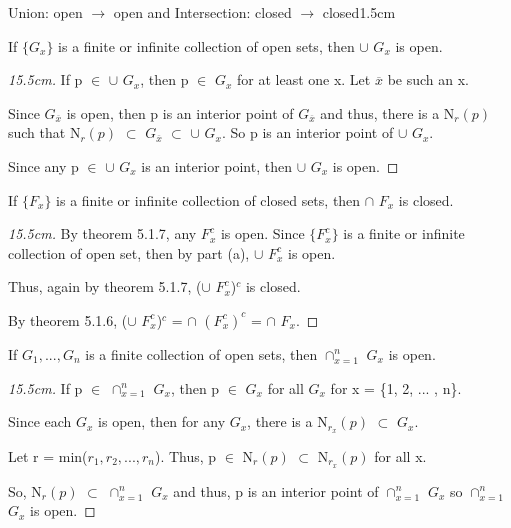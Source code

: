	\begin{ltheorem}{Union: open $\rightarrow$ open and
	Intersection: closed $\rightarrow$ closed}{1.5cm}
		\item If $\{G_x\}$ is a finite or infinite collection of open sets,
		then $\cup$ $G_x$ is open.

			\begin{proof}[15.5cm]
				If p $\in$ $\cup$ $G_x$, then p $\in$ $G_x$ for at least one x.
				Let $\overline{x}$ be such an x.

				Since $G_{\overline{x}}$ is open, then p is an interior point of
				$G_{\overline{x}}$ and thus, there is a N$_r(p)$ such that
				N$_r(p)$ $\subset$ $G_{\overline{x}}$ $\subset$ $\cup$ $G_x$.
				So p is an interior point of $\cup$ $G_x$.

				Since any p $\in$ $\cup$ $G_x$ is an interior point, then
				$\cup$ $G_x$ is open.
			\end{proof}

		\item If $\{F_x\}$ is a finite or infinite collection of closed sets,
		then $\cap$ $F_x$ is closed.

			\begin{proof}[15.5cm]
				By {\color{red} theorem 5.1.7}, any $F_x^c$ is open.
				Since $\{F_x^c\}$ is a finite or infinite collection of
				open set, then by part (a), $\cup$ $F_x^c$ is open.

				Thus, again by {\color{red} theorem 5.1.7},
				($\cup$ $F_x^c$)$^c$ is closed.

				By {\color{red} theorem 5.1.6},
				($\cup$ $F_x^c$)$^c$ = $\cap$ $(F_x^c)^c$
				= $\cap$ $F_x$.
			\end{proof}

		\item If $G_1, ... , G_n$ is a finite collection of open sets,
		then $\cap_{x=1}^n$ $G_x$ is open.

			\begin{proof}[15.5cm]
				If p $\in$ $\cap_{x=1}^n$ $G_x$, then p $\in$ $G_x$ for
				all $G_x$ for x = \{1, 2, ... , n\}.

				Since each $G_x$ is open, then for any $G_x$, there is a
				N$_{r_x}(p)$ $\subset$ $G_x$.

				Let r = min($r_1, r_2 , ... , r_n$).
				Thus, p $\in$ N$_r(p)$ $\subset$ N$_{r_x}(p)$ for all x.

				So, N$_r(p)$ $\subset$ $\cap_{x=1}^n$ $G_x$ and thus,
				p is an interior point of $\cap_{x=1}^n$ $G_x$ so
				$\cap_{x=1}^n$ $G_x$ is open.


\end{proof}
\end{ltheorem}
